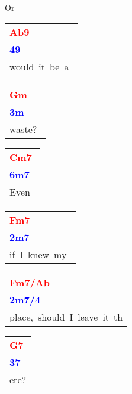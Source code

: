 \documentclass[12pt,a4paper,openany,UTF8]{memoir}
\begin{document}
Or~\begin{tabular}[b]{l}
    \textbf{\textcolor{red}{Ab9}}\\\textbf{\textcolor{blue}{49}}\\
    would~it~be~a~\mbox{}\end{tabular}\begin{tabular}[b]{l}
    \textbf{\textcolor{red}{Gm}}\\\textbf{\textcolor{blue}{3m}}\\
    waste?~\mbox{}\end{tabular}\begin{tabular}[b]{l}
    \textbf{\textcolor{red}{Cm7}}\\\textbf{\textcolor{blue}{6m7}}\\
    Even~\mbox{}\end{tabular}\begin{tabular}[b]{l}
    \textbf{\textcolor{red}{Fm7}}\\\textbf{\textcolor{blue}{2m7}}\\
    if~I~knew~my~\mbox{}\end{tabular}\begin{tabular}[b]{l}
    \textbf{\textcolor{red}{Fm7/Ab}}\\\textbf{\textcolor{blue}{2m7/4}}\\
    place,~should~I~leave~it~th\mbox{}\end{tabular}\begin{tabular}[b]{l}
    \textbf{\textcolor{red}{G7}}\\\textbf{\textcolor{blue}{37}}\\
    ere?\mbox{}\end{tabular}\\
\end{document}
